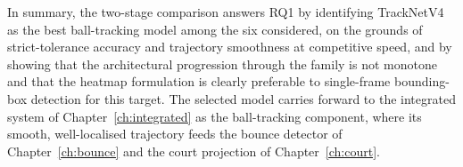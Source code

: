 In summary, the two-stage comparison answers RQ1 by identifying TrackNetV4 as
the best ball-tracking model among the six considered, on the grounds of
strict-tolerance accuracy and trajectory smoothness at competitive speed, and by
showing that the architectural progression through the family is not monotone
and that the heatmap formulation is clearly preferable to single-frame
bounding-box detection for this target. The selected model carries forward to
the integrated system of Chapter~\ref{ch:integrated} as the ball-tracking
component, where its smooth, well-localised trajectory feeds the bounce detector
of Chapter~\ref{ch:bounce} and the court projection of Chapter~\ref{ch:court}.
